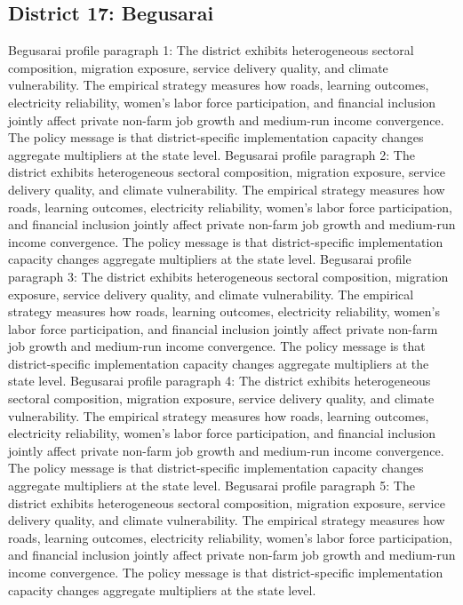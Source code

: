 \documentclass[preprint,12pt]{elsarticle}
\begin{document}
\subsection{District 17: Begusarai}
Begusarai profile paragraph 1: The district exhibits heterogeneous sectoral composition, migration exposure, service delivery quality, and climate vulnerability. The empirical strategy measures how roads, learning outcomes, electricity reliability, women's labor force participation, and financial inclusion jointly affect private non-farm job growth and medium-run income convergence. The policy message is that district-specific implementation capacity changes aggregate multipliers at the state level.
Begusarai profile paragraph 2: The district exhibits heterogeneous sectoral composition, migration exposure, service delivery quality, and climate vulnerability. The empirical strategy measures how roads, learning outcomes, electricity reliability, women's labor force participation, and financial inclusion jointly affect private non-farm job growth and medium-run income convergence. The policy message is that district-specific implementation capacity changes aggregate multipliers at the state level.
Begusarai profile paragraph 3: The district exhibits heterogeneous sectoral composition, migration exposure, service delivery quality, and climate vulnerability. The empirical strategy measures how roads, learning outcomes, electricity reliability, women's labor force participation, and financial inclusion jointly affect private non-farm job growth and medium-run income convergence. The policy message is that district-specific implementation capacity changes aggregate multipliers at the state level.
Begusarai profile paragraph 4: The district exhibits heterogeneous sectoral composition, migration exposure, service delivery quality, and climate vulnerability. The empirical strategy measures how roads, learning outcomes, electricity reliability, women's labor force participation, and financial inclusion jointly affect private non-farm job growth and medium-run income convergence. The policy message is that district-specific implementation capacity changes aggregate multipliers at the state level.
Begusarai profile paragraph 5: The district exhibits heterogeneous sectoral composition, migration exposure, service delivery quality, and climate vulnerability. The empirical strategy measures how roads, learning outcomes, electricity reliability, women's labor force participation, and financial inclusion jointly affect private non-farm job growth and medium-run income convergence. The policy message is that district-specific implementation capacity changes aggregate multipliers at the state level.
\end{document}
